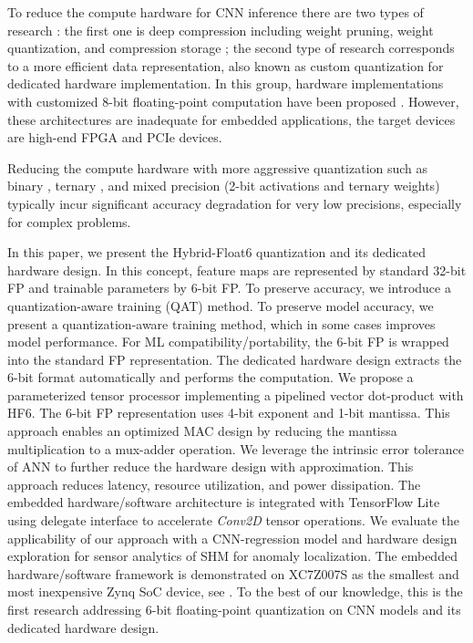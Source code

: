 To reduce the compute hardware for CNN inference there are two types of research \cite{wu2021low}: the first one is deep compression including weight pruning, weight quantization, and compression storage \cite{han2015deep,han2015learning}; the second type of research corresponds to a more efficient data representation, also known as custom quantization for dedicated hardware implementation. In this group, hardware implementations with customized 8-bit floating-point computation have been proposed \cite{mei2017200mhz, wu2021low, lian2019high}. However, these architectures are inadequate for embedded applications, the target devices are high-end FPGA and PCIe devices.

Reducing the compute hardware with more aggressive quantization such as binary \cite{courbariaux2015binaryconnect}, ternary \cite{lin2015neural}, and mixed precision (2-bit activations and ternary weights) \cite{colangelo2018exploration} typically incur significant accuracy degradation for very low precisions, especially for complex problems\cite{faraone2019addnet}.

In this paper, we present the Hybrid-Float6 quantization and its dedicated hardware design. In this concept, feature maps are represented by standard 32-bit FP and trainable parameters by 6-bit FP. To preserve accuracy, we introduce a quantization-aware training (QAT) method. To preserve model accuracy, we present a quantization-aware training method, which in some cases improves model performance. For ML compatibility/portability, the 6-bit FP is wrapped into the standard FP representation. The dedicated hardware design extracts the 6-bit format automatically and performs the computation. We propose a parameterized tensor processor implementing a pipelined vector dot-product with HF6. The 6-bit FP representation uses 4-bit exponent and 1-bit mantissa. This approach enables an optimized MAC design by reducing the mantissa multiplication to a mux-adder operation. We leverage the intrinsic error tolerance of ANN to further reduce the hardware design with approximation. This approach reduces latency, resource utilization, and power dissipation. The embedded hardware/software architecture is integrated with TensorFlow Lite using delegate interface to accelerate \emph{Conv2D} tensor operations. We evaluate the applicability of our approach with a CNN-regression model and hardware design exploration for sensor analytics of SHM for anomaly localization. The embedded hardware/software framework is demonstrated on XC7Z007S as the smallest and most inexpensive Zynq SoC device, see . To the best of our knowledge, this is the first research addressing 6-bit floating-point quantization on CNN models and its dedicated hardware design.

